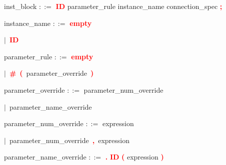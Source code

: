 \vspace{1em}
\noindent
\settowidth{\parindent}{\hspace{4ex}}

\vspace{1em}
\noindent
\settowidth{\parindent}{\hspace{4ex}}
inst\_block $::=$\hspace{1ex} \textbf{\textcolor{red}{ID}} parameter\_rule instance\_name connection\_spec \textbf{\textcolor{red}{;}}

\vspace{1em}
\noindent
\settowidth{\parindent}{\hspace{4ex}}
instance\_name $::=$\hspace{1ex} \textbf{\textcolor{red}{empty}}

\mbox{$|$ \textbf{\textcolor{red}{ID}}}

\vspace{1em}
\noindent
\settowidth{\parindent}{\hspace{4ex}}
parameter\_rule $::=$\hspace{1ex} \textbf{\textcolor{red}{empty}}

\mbox{$|$ \textbf{\textcolor{red}{\textbf{\textcolor{red}{\#}}}} \textbf{\textcolor{red}{(}} parameter\_override \textbf{\textcolor{red}{)}}}

\vspace{1em}
\noindent
\settowidth{\parindent}{\hspace{4ex}}
parameter\_override $::=$\hspace{1ex} parameter\_num\_override

\mbox{$|$ parameter\_name\_override}

\vspace{1em}
\noindent
\settowidth{\parindent}{\hspace{4ex}}
parameter\_num\_override $::=$\hspace{1ex} expression

\mbox{$|$ parameter\_num\_override \textbf{\textcolor{red}{,}} expression}

\vspace{1em}
\noindent
\settowidth{\parindent}{\hspace{4ex}}
parameter\_name\_override $::=$\hspace{1ex} \textbf{\textcolor{red}{.}} \textbf{\textcolor{red}{ID}} \textbf{\textcolor{red}{(}} expression \textbf{\textcolor{red}{)}}

